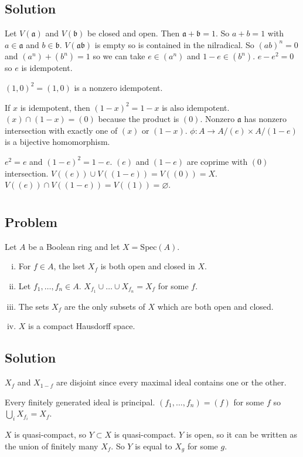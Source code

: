 \documentclass[book,12pt,oneside,openany]{memoir}
\begin{document}
\subsection{Solution}
Let $V(\mathfrak a)$ and $V(\mathfrak b)$ be closed and open.
Then $\mathfrak a+\mathfrak b=1$.
So $a+b=1$ with $a\in\mathfrak a$ and $b\in\mathfrak b$.
$V(\mathfrak a\mathfrak b)$ is empty so is contained in the nilradical.
So $(ab)^n=0$ and $(a^n)+(b^n)=1$ so we can take $e\in(a^n)$ and
$1-e\in(b^n)$.
$e-e^2=0$ so $e$ is idempotent.

$(1,0)^2=(1,0)$ is a nonzero idempotent.

If $x$ is idempotent, then $(1-x)^2=1-x$ is also idempotent.
$(x)\cap(1-x)=(0)$ because the product is $(0)$.
Nonzero $\mathfrak a$ has nonzero intersection with exactly one of
$(x)$ or $(1-x)$.
$\phi:A\to A/(e)\times A/(1-e)$ is a bijective homomorphism.

$e^2=e$ and $(1-e)^2=1-e$.
$(e)$ and $(1-e)$ are coprime with $(0)$ intersection.
$V((e))\cup V((1-e))=V((0))=X$.
$V((e))\cap V((1-e))=V((1))=\varnothing$.
\section{}
\subsection{Problem}
Let $A$ be a Boolean ring and let $X=\text{Spec}(A)$.
\begin{enumerate}[i)]
\item For $f\in A$, the lset $X_f$ is both open and closed in $X$.
\item Let $f_1,\dots,f_n\in A$.  $X_{f_1}\cup\dots\cup X_{f_n}=X_f$
for some $f$.
\item The sets $X_f$ are the only subsets of $X$ which are both
open and closed.
\item $X$ is a compact Hausdorff space.
\end{enumerate}
\subsection{Solution}
$X_f$ and $X_{1-f}$ are disjoint since every maximal ideal contains
one or the other.

Every finitely generated ideal is principal.
$(f_1, \dots, f_n)=(f)$ for some $f$ so
$\bigcup_i X_{f_i}=X_f$.

$X$ is quasi-compact, so $Y \subset X$ is quasi-compact.
$Y$ is open, so it can be written as the union of finitely
many $X_f$.
So $Y$ is equal to $X_g$ for some $g$.
\end{document}
